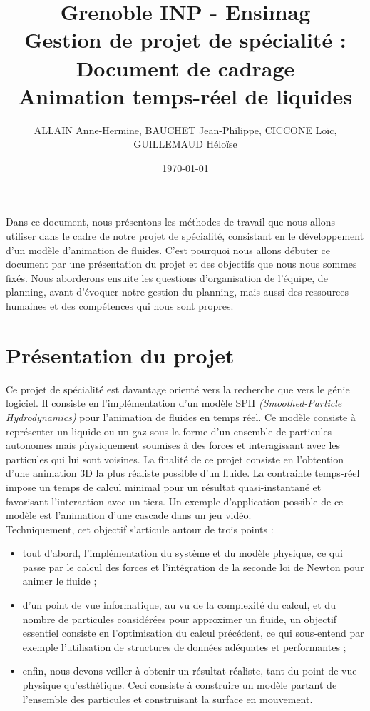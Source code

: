 \documentclass[12pt]{article}
\title{Grenoble INP - Ensimag \\ Gestion de projet de spécialité : Document de cadrage \\ Animation temps-réel de liquides}
\author{ALLAIN Anne-Hermine, BAUCHET Jean-Philippe, CICCONE Loïc, GUILLEMAUD Héloïse}
\date{\today}
\begin{document}
\maketitle

Dans ce document, nous présentons les méthodes de travail que nous allons utiliser dans le cadre de notre projet de spécialité, consistant en le développement d'un modèle d'animation de fluides. C'est pourquoi nous allons débuter ce document par une présentation du projet et des objectifs que nous nous sommes fixés. Nous aborderons ensuite les questions d'organisation de l'équipe, de planning, avant d'évoquer notre gestion du planning, mais aussi des ressources humaines et des compétences qui nous sont propres.

\section{Présentation du projet}

Ce projet de spécialité est davantage orienté vers la recherche que vers le génie logiciel. Il consiste en l'implémentation d'un modèle SPH {\em (Smoothed-Particle Hydrodynamics)} pour l'animation de fluides en temps réel. Ce modèle consiste à représenter un liquide ou un gaz sous la forme d'un ensemble de particules autonomes mais physiquement soumises à des forces et interagissant avec les particules qui lui sont voisines. La finalité de ce projet consiste en l'obtention d'une animation 3D la plus réaliste possible d'un fluide. La contrainte temps-réel impose un temps de calcul minimal pour un résultat quasi-instantané et favorisant l'interaction avec un tiers. Un exemple d'application possible de ce modèle est l'animation d'une cascade dans un jeu vidéo. \\

Techniquement, cet objectif s'articule autour de trois points : \\

\begin{itemize}
\item tout d'abord, l'implémentation du système et du modèle physique, ce qui passe par le calcul des forces et l'intégration de la seconde loi de Newton pour animer le fluide ;
\item d'un point de vue informatique, au vu de la complexité du calcul, et du nombre de particules considérées pour approximer un fluide, un objectif essentiel consiste en l'optimisation du calcul précédent, ce qui sous-entend par exemple l'utilisation de structures de données adéquates et performantes ;
\item enfin, nous devons veiller à obtenir un résultat réaliste, tant du point de vue physique qu'esthétique. Ceci consiste à construire un modèle partant de l'ensemble des particules et construisant la surface en mouvement. \\
\end{itemize}
\end{document}
